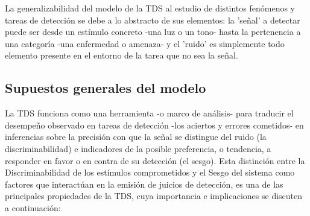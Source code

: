 La generalizabilidad del modelo de la TDS al estudio de distintos fenómenos y tareas de detección se debe a lo abstracto de sus elementos: la 'señal' a detectar puede ser desde un estímulo concreto -una luz o un tono- hasta la pertenencia a una categoría -una enfermedad o amenaza- y el 'ruido' es simplemente todo elemento presente en el entorno de la tarea que no sea la señal.\\ 

\subsection{Supuestos generales del modelo}

La TDS funciona como una herramienta -o marco de análisis- para traducir el desempeño observado en tareas de detección -los aciertos y errores cometidos- en inferencias sobre la precisión con que la señal se distingue del ruido (la discriminabilidad) e indicadores de la posible preferencia, o tendencia, a responder en favor o en contra de su detección (el sesgo). Esta distinción entre la Discriminabilidad de los estímulos comprometidos y el Sesgo del sistema como factores que interactúan en la emisión de juicios de detección, es una de las principales propiedades de la TDS, cuya importancia e implicaciones se discuten a continuación:\\


